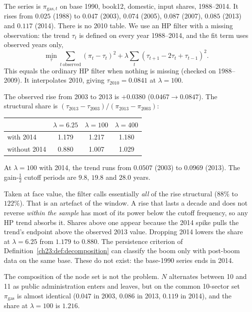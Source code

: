 \documentclass[../solutions_manual.tex]{subfiles}
\begin{document}

 The series is $\pi_{\text{gas},t}$ on base 1990, book12, domestic, input shares, 1988--2014. It rises from $0.025$ (1988) to $0.047$ (2003), $0.074$ (2005), $0.087$ (2007), $0.085$ (2013) and $0.117$ (2014). There is no 2010 table. We use an HP filter with a missing observation: the trend $\tau_t$ is defined on every year 1988--2014, and the fit term uses observed years only,
\[
\min_{\tau}\sum_{t\ \text{observed}}(\pi_t - \tau_t)^2 + \lambda\sum_{t}(\tau_{t+1} - 2\tau_t + \tau_{t-1})^2 .
\]
This equals the ordinary HP filter when nothing is missing (checked on 1988--2009). It interpolates 2010, giving $\tau_{2010} = 0.0841$ at $\lambda = 100$.

 The observed rise from 2003 to 2013 is $+0.0380$ ($0.0467 \to 0.0847$). The structural share is $(\tau_{2013} - \tau_{2003})/(\pi_{2013} - \pi_{2003})$:
\begin{center}\small
\begin{tabular}{lccc}
\toprule
& $\lambda = 6.25$ & $\lambda = 100$ & $\lambda = 400$ \\
\midrule
with 2014 & 1.179 & 1.217 & 1.180 \\
without 2014 & 0.880 & 1.007 & 1.029 \\
\bottomrule
\end{tabular}
\end{center}
At $\lambda = 100$ with 2014, the trend runs from $0.0507$ (2003) to $0.0969$ (2013). The gain-$\tfrac12$ cutoff periods are $9.8$, $19.8$ and $28.0$ years.

 Taken at face value, the filter calls essentially \emph{all} of the rise structural ($88\%$ to $122\%$). That is an artefact of the window. A rise that lasts a decade and does not reverse \emph{within the sample} has most of its power below the cutoff frequency, so any HP trend absorbs it. Shares above one appear because the 2014 spike pulls the trend's endpoint above the observed 2013 value. Dropping 2014 lowers the share at $\lambda = 6.25$ from $1.179$ to $0.880$. The persistence criterion of Definition~\ref{ch23:def:decomposition} can classify the boom only with post-boom data on the same base. These do not exist: the base-1990 series ends in 2014.

The composition of the node set is not the problem. $N$ alternates between 10 and 11 as public administration enters and leaves, but on the common 10-sector set $\pi_{\text{gas}}$ is almost identical ($0.047$ in 2003, $0.086$ in 2013, $0.119$ in 2014), and the share at $\lambda = 100$ is $1.216$.
\end{document}

